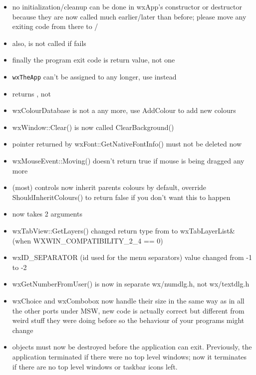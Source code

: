 
\begin{itemize}\itemsep=0pt
\item no initialization/cleanup can be done in wxApp's constructor or destructor because they are now called much earlier/later than before; please move any exiting code from there to / 
\item also,  is not called if  fails
\item finally the program exit code is  return value, not  one
\item \texttt{wxTheApp} can't be assigned to any longer, use  instead
\item {} returns , not 
\item wxColourDatabase is not a  any more, use AddColour to add new colours
\item wxWindow::Clear() is now called ClearBackground()
\item pointer returned by wxFont::GetNativeFontInfo() must not be deleted now
\item wxMouseEvent::Moving() doesn't return true if mouse is being dragged any more
\item (most) controls now inherit parents colours by default, override ShouldInheritColours() to return false if you don't want this to happen
\item {} now takes 2 arguments
\item wxTabView::GetLayers() changed return type from  to wxTabLayerList\& (when WXWIN\_COMPATIBILITY\_2\_4 == 0)
\item wxID\_SEPARATOR (id used for the menu separators) value changed from -1 to -2
\item wxGetNumberFromUser() is now in separate wx/numdlg.h, not wx/textdlg.h
\item wxChoice and wxCombobox now handle their size in the same way as in all the other ports under MSW, new code is actually correct but different from weird stuff they were doing before so the behaviour of your programs might change
\item {} objects must now be destroyed before the application can exit.  Previously, the application terminated if there were no top level windows; now it terminates if there are no top level windows or taskbar icons left.

\end{itemize}

